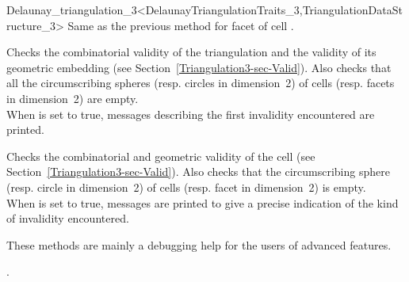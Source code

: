 \begin{ccRefClass}{Delaunay_triangulation_3<DelaunayTriangulationTraits_3,TriangulationDataStructure_3>}
{Same as the previous method for facet  of cell .}

\begin{ccAdvanced}
{Checks the combinatorial validity of the triangulation and the
validity of its geometric embedding (see
Section~\ref{Triangulation3-sec-Valid}). Also checks that all the
circumscribing spheres (resp. circles in dimension~2) of  cells
(resp. facets in dimension~2) are empty.\\ When  is set to
true,  messages describing the first invalidity encountered are
printed.}

{Checks the combinatorial and geometric validity of the cell (see
Section~\ref{Triangulation3-sec-Valid}). Also checks that the
circumscribing sphere (resp. circle in dimension~2) of  cells
(resp. facet in dimension~2) is empty.\\
 When  is set to
true, messages are printed to give
a precise indication of the kind of invalidity encountered.}

These methods are  mainly a debugging help for the users of advanced features.
\end{ccAdvanced}

\ccSeeAlso

.



\end{ccRefClass}


